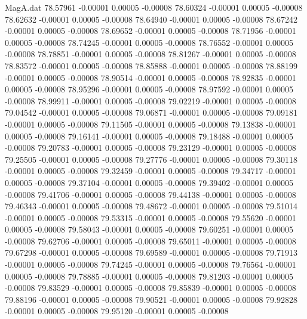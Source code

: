 \begin{filecontents}{MagA.dat}
  78.57961   -0.00001    0.00005   -0.00008
  78.60324   -0.00001    0.00005   -0.00008
  78.62632   -0.00001    0.00005   -0.00008
  78.64940   -0.00001    0.00005   -0.00008
  78.67242   -0.00001    0.00005   -0.00008
  78.69652   -0.00001    0.00005   -0.00008
  78.71956   -0.00001    0.00005   -0.00008
  78.74245   -0.00001    0.00005   -0.00008
  78.76552   -0.00001    0.00005   -0.00008
  78.78851   -0.00001    0.00005   -0.00008
  78.81267   -0.00001    0.00005   -0.00008
  78.83572   -0.00001    0.00005   -0.00008
  78.85888   -0.00001    0.00005   -0.00008
  78.88199   -0.00001    0.00005   -0.00008
  78.90514   -0.00001    0.00005   -0.00008
  78.92835   -0.00001    0.00005   -0.00008
  78.95296   -0.00001    0.00005   -0.00008
  78.97592   -0.00001    0.00005   -0.00008
  78.99911   -0.00001    0.00005   -0.00008
  79.02219   -0.00001    0.00005   -0.00008
  79.04542   -0.00001    0.00005   -0.00008
  79.06871   -0.00001    0.00005   -0.00008
  79.09181   -0.00001    0.00005   -0.00008
  79.11505   -0.00001    0.00005   -0.00008
  79.13838   -0.00001    0.00005   -0.00008
  79.16141   -0.00001    0.00005   -0.00008
  79.18488   -0.00001    0.00005   -0.00008
  79.20783   -0.00001    0.00005   -0.00008
  79.23129   -0.00001    0.00005   -0.00008
  79.25505   -0.00001    0.00005   -0.00008
  79.27776   -0.00001    0.00005   -0.00008
  79.30118   -0.00001    0.00005   -0.00008
  79.32459   -0.00001    0.00005   -0.00008
  79.34717   -0.00001    0.00005   -0.00008
  79.37104   -0.00001    0.00005   -0.00008
  79.39402   -0.00001    0.00005   -0.00008
  79.41706   -0.00001    0.00005   -0.00008
  79.44138   -0.00001    0.00005   -0.00008
  79.46343   -0.00001    0.00005   -0.00008
  79.48672   -0.00001    0.00005   -0.00008
  79.51014   -0.00001    0.00005   -0.00008
  79.53315   -0.00001    0.00005   -0.00008
  79.55620   -0.00001    0.00005   -0.00008
  79.58043   -0.00001    0.00005   -0.00008
  79.60251   -0.00001    0.00005   -0.00008
  79.62706   -0.00001    0.00005   -0.00008
  79.65011   -0.00001    0.00005   -0.00008
  79.67298   -0.00001    0.00005   -0.00008
  79.69589   -0.00001    0.00005   -0.00008
  79.71913   -0.00001    0.00005   -0.00008
  79.74245   -0.00001    0.00005   -0.00008
  79.76564   -0.00001    0.00005   -0.00008
  79.78885   -0.00001    0.00005   -0.00008
  79.81203   -0.00001    0.00005   -0.00008
  79.83529   -0.00001    0.00005   -0.00008
  79.85839   -0.00001    0.00005   -0.00008
  79.88196   -0.00001    0.00005   -0.00008
  79.90521   -0.00001    0.00005   -0.00008
  79.92828   -0.00001    0.00005   -0.00008
  79.95120   -0.00001    0.00005   -0.00008

\end{filecontents}
